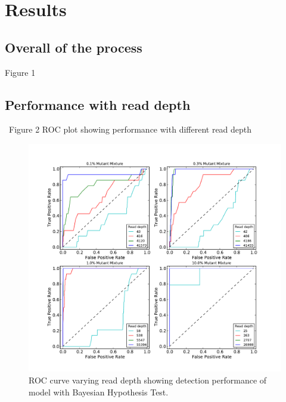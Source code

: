 \documentclass[11pt,reqno]{amsart}
\begin{document}
\section{Results}

\subsection{Overall of the process}
Figure 1 

\subsection{Performance with read depth}\
Figure 2 ROC plot showing performance with different read depth

\begin{figure}[h]
\begin{center}
\includegraphics[width=160mm]{pdf_figs/ROC_without_chi2.pdf}
\caption{ROC curve varying read depth showing detection performance of model with Bayesian Hypothesis Test.}
\label{fig:ROC_without_chi2}
\end{center}
\end{figure}
\end{document}
